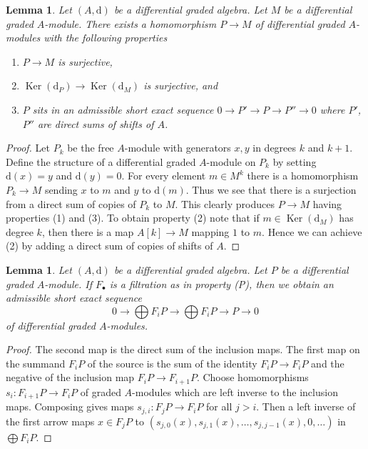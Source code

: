 \documentclass{amsart}
\theoremstyle{plain}
\newtheorem{lemma}[subsection]{Lemma}
\theoremstyle{definition}
\theoremstyle{remark}
\numberwithin{equation}{subsection}
\def\Ker{\mathop{\mathrm{Ker}}}
\begin{document}
\begin{lemma}
\label{lemma-good-quotient}
Let $(A, \text{d})$ be a differential graded algebra.
Let $M$ be a differential graded $A$-module. There exists a homomorphism
$P \to M$ of differential graded $A$-modules with the following
properties
\begin{enumerate}
\item $P \to M$ is surjective,
\item $\Ker(\text{d}_P) \to \Ker(\text{d}_M)$ is surjective, and
\item $P$ sits in an admissible short exact sequence
$0 \to P' \to P \to P'' \to 0$ where $P'$, $P''$ are direct sums
of shifts of $A$.
\end{enumerate}
\end{lemma}

\begin{proof}
Let $P_k$ be the free $A$-module with generators $x, y$ in degrees
$k$ and $k + 1$. Define the structure of a differential graded
$A$-module on $P_k$ by setting $\text{d}(x) = y$ and $\text{d}(y) = 0$.
For every element $m \in M^k$ there is a homomorphism
$P_k \to M$ sending $x$ to $m$ and $y$ to $\text{d}(m)$.
Thus we see that there is a surjection from a direct sum
of copies of $P_k$ to $M$. This clearly produces $P \to M$
having properties (1) and (3). To obtain property (2) note
that if $m \in \Ker(\text{d}_M)$ has degree $k$, then there is a map
$A[k] \to M$ mapping $1$ to $m$. Hence we can achieve (2) by adding
a direct sum of copies of shifts of $A$.
\end{proof}


\begin{lemma}
\label{lemma-property-P-sequence}
Let $(A, \text{d})$ be a differential graded algebra.
Let $P$ be a differential graded $A$-module. If $F_\bullet$
is a filtration as in property (P), then we obtain an
admissible short exact sequence
$$
0 \to
\bigoplus\nolimits F_iP \to
\bigoplus\nolimits F_iP \to P \to 0
$$
of differential graded $A$-modules.
\end{lemma}

\begin{proof}
The second map is the direct sum of the inclusion maps.
The first map on the summand $F_iP$ of the source is the sum
of the identity $F_iP \to F_iP$ and the negative of the inclusion
map $F_iP \to F_{i + 1}P$. Choose homomorphisms $s_i : F_{i + 1}P \to F_iP$
of graded $A$-modules which are left inverse to the inclusion maps.
Composing gives maps $s_{j, i} : F_jP \to F_iP$ for all $j > i$.
Then a left inverse of the first arrow maps $x \in F_jP$ to
$(s_{j, 0}(x), s_{j, 1}(x), \ldots, s_{j, j - 1}(x), 0, \ldots)$
in $\bigoplus F_iP$.
\end{proof}
\end{document}

